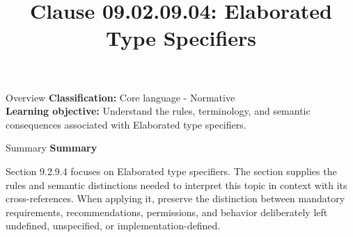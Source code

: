 \documentclass[10pt,letterpaper]{article}
\title{Clause 09.02.09.04: Elaborated Type Specifiers}
\author{}
\date{}
\begin{document}
\maketitle
\begin{CornellOverviewBox}{Overview}
\textbf{Classification:} Core language - Normative\\[2pt]
\textbf{Learning objective:} Understand the rules, terminology, and semantic consequences associated with Elaborated type specifiers.
\end{CornellOverviewBox}\begin{CornellSummaryBox}{Summary}
{\sffamily\bfseries\color{Accent} Summary}\par\vspace{3pt}Section 9.2.9.4 focuses on Elaborated type specifiers. The section supplies the rules and semantic distinctions needed to interpret this topic in context with its cross-references. When applying it, preserve the distinction between mandatory requirements, recommendations, permissions, and behavior deliberately left undefined, unspecified, or implementation-defined.
\end{CornellSummaryBox}
\end{document}
